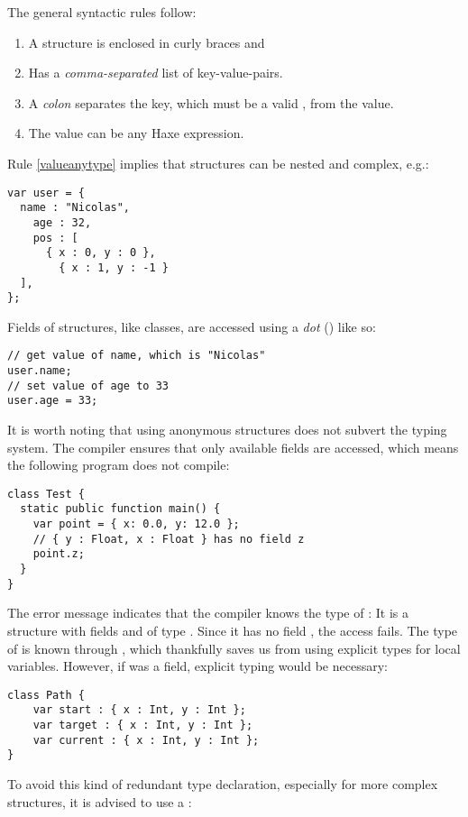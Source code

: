 The general syntactic rules follow:

\begin{enumerate}
	\item A structure is enclosed in curly braces \expr{$\left\{\right\}$} and
	\item Has a \emph{comma-separated} list of key-value-pairs.
	\item A \emph{colon} separates the key, which must be a valid , from the value.
	\item\label{valueanytype} The value can be any Haxe expression.
\end{enumerate}
Rule \ref{valueanytype} implies that structures can be nested and complex, e.g.:


\begin{lstlisting}
var user = {
  name : "Nicolas",
	age : 32,
	pos : [
	  { x : 0, y : 0 },
		{ x : 1, y : -1 }
  ],
};
\end{lstlisting}
Fields of structures, like classes, are accessed using a \emph{dot} () like so:

\begin{lstlisting}
// get value of name, which is "Nicolas"
user.name;
// set value of age to 33
user.age = 33;
\end{lstlisting}
It is worth noting that using anonymous structures does not subvert the typing system. The compiler ensures that only available fields are accessed, which means the following program does not compile:

\begin{lstlisting}
class Test {
  static public function main() {
    var point = { x: 0.0, y: 12.0 };
    // { y : Float, x : Float } has no field z
    point.z;
  }
}
\end{lstlisting}
The error message indicates that the compiler knows the type of : It is a structure with fields  and  of type . Since it has no field , the access fails.
The type of  is known through , which thankfully saves us from using explicit types for local variables. However, if  was a field, explicit typing would be necessary:

\begin{lstlisting}
class Path {
    var start : { x : Int, y : Int };
    var target : { x : Int, y : Int };
    var current : { x : Int, y : Int };
}
\end{lstlisting}
To avoid this kind of redundant type declaration, especially for more complex structures, it is advised to use a :

